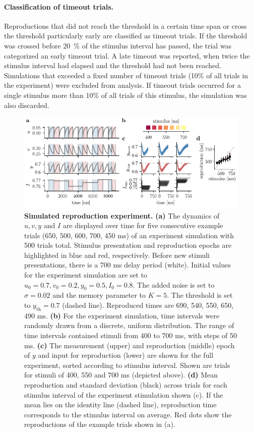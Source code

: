 \documentclass[10pt, a4paper]{article}
\begin{document}
\paragraph{Classification of timeout trials.}
Reproductions that did not reach the threshold in a certain time span or cross the threshold particularly early are classified as timeout trials.
If the threshold was crossed before 20~\% of the stimulus interval has passed, the trial was categorized an early timeout trial.
A late timeout was reported, when twice the stimulus interval had elapsed and the threshold had not been reached.
Simulations that exceeded a fixed number of timeout trials (10\% of all trials in the experiment) were excluded from analysis.
If timeout trials occurred for a single stimulus more than 10\% of all trials of this stimulus, the simulation was also discarded.

\begin{figure}[ht]
	\centering
	\includegraphics{figures/trial.pdf}
	\caption{\textbf{Simulated reproduction experiment.} 
	\textbf{(a)} The dynamics of $u, v, y $ and $I$ are displayed over time for five consecutive example trials (650, 500, 600, 700, 450 ms) of an experiment simulation with 500 trials total. Stimulus presentation and reproduction epochs are highlighted in blue and red, respectively. Before new stimuli presentations, there is a 700 ms delay period (white). Initial values for the experiment simulation are set to $u_0=0.7, v_0=0.2, y_0=0.5, I_0=0.8$. The added noise is set to $\sigma=0.02$ and the memory parameter to $K=5$. The threshold is set to $y_{\text{th}}=0.7$ (dashed line). Reproduced times are 690, 540, 550, 650, 490 ms.
	\textbf{(b)} For the experiment simulation, time intervals were randomly drawn from a discrete, uniform distribution. The range of time intervals contained stimuli from 400 to 700 ms, with steps of 50 ms.
	\textbf{(c)} The measurement (upper) and reproduction (middle) epoch of $y$ and input for reproduction (lower) are shown for the full experiment, sorted according to stimulus interval. Shown are trials for stimuli of 400, 550 and 700 ms (depicted above).
	\textbf{(d)} Mean reproduction and standard deviation (black) across trials for each stimulus interval of the experiment stimulation shown (c). If the mean lies on the identity line (dashed line), reproduction time corresponds to the stimulus interval on average. Red dots show the reproductions of the example trials shown in (a). 
	}
\label{fig:experiment}
\end{figure}
\end{document}
